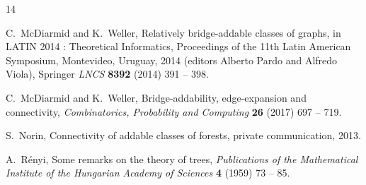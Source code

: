\documentclass[12pt]{article}
\newcommand{\m}[1]{\marginpar{\tiny{#1}}}
\begin{document}
\begin{thebibliography}{14}
  
C.~McDiarmid and K.~Weller, 
Relatively bridge-addable classes of graphs,
in LATIN 2014 : Theoretical Informatics,
Proceedings of the 11th Latin American Symposium, Montevideo, Uruguay, %
 2014 (editors Alberto Pardo and Alfredo Viola), Springer \emph{LNCS} {\bf 8392} (2014) 391 -- 398.
  
   
C.~McDiarmid and K.~Weller,
Bridge-addability, edge-expansion and connectivity,
{\em Combinatorics, Probability and Computing} {\bf 26} (2017) 697 -- 719. 


  S.~Norin, Connectivity of addable classes of forests, private communication, 2013.


   A.~R\'enyi,
   Some remarks on the theory of trees,
   {\em Publications of the Mathematical Institute of the
   Hungarian Academy of Sciences} {\bf 4} (1959) 73 -- 85.

\end{thebibliography}
\end{document}
